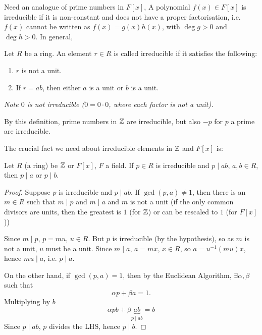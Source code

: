 \documentclass[10pt, a4paper]{article}
\begin{document}
Need an analogue of prime numbers in $F[x]$,
A polynomial $f(x) \in F[x]$ is irreducible if it is non-constant and does not have a proper factorisation,
i.e. $f(x)$ cannot be written as $f(x) = g(x)h(x)$,
with $\deg{g} > 0$ and $\deg{h} > 0$.
In general,

\begin{definition}
    Let $R$ be a ring.
    An element $r \in R$ is called irreducible if it satisfies the following:
    \begin{enumerate}[label = (\roman*)]
        \item $r$ is not a unit.

        \item If $r = ab$,
        then either $a$ is a unit or $b$ is a unit.
    \end{enumerate}
\end{definition}

\textit{Note $0$ is not irreducible
($0 = 0 \cdot 0$,
where each factor is not a unit).}

By this definition,
prime numbers in $\mathbb{Z}$ are irreducible,
but also $-p$ for $p$ a prime are irreducible.

The crucial fact we need about irreducible elements in $\mathbb{Z}$ and $F[x]$ is:
\begin{lemma}\label{algII:lem:genirrediff}
    Let $R$
    (a ring)
    be $\mathbb{Z}$ or $F[x]$,
    $F$ a field.
    If $p \in R$ is irreducible and $p \mid ab$,
    $a, b \in R$,
    then $p \mid a$ or $p \mid b$.

    \begin{proof}
        Suppose $p$ is irreducible and $p \mid ab$.
        If $\gcd(p, a) \neq 1$,
        then there is an $m \in R$ such that $m \mid p$ and $m \mid a$ and $m$ is not a unit
        (if the only common divisors are units,
        then the greatest is $1$
        (for $\mathbb{Z}$)
        or can be rescaled to $1$
        (for $F[x]$))

        Since $m \mid p$,
        $p = mu$,
        $u \in R$.
        But $p$ is irreducible
        (by the hypothesis),
        so as $m$ is not a unit,
        $u$ must be a unit.
        Since $m \mid a$,
        $a = mx$,
        $x \in R$,
        so $a = u ^ {-1}(mu)x$,
        hence $mu \mid a$,
        i.e. $p \mid a$.

        On the other hand,
        if $\gcd(p, a) = 1$,
        then by the Euclidean Algorithm,
        $\exists \alpha, \beta$ such that
        \[
        \alpha p + \beta a = 1.
        \]
        Multiplying by $b$
        \[
        \alpha pb + \beta \underbrace{ab}_{p \mid ab} = b
        \]
        Since $p \mid ab$,
        $p$ divides the LHS,
        hence $p \mid b$.
    \end{proof}
\end{lemma}
\end{document}
